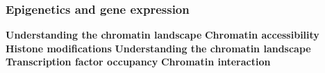 %
%
%
%
%
%
%
%
%
%
%
%
%
%
%

\subsubsection*{Epigenetics and gene expression}
\textbf{Understanding the chromatin landscape}
\textbf{Chromatin accessibility}
\textbf{Histone modifications}
\textbf{Understanding the chromatin landscape}
\textbf{Transcription factor occupancy}
\textbf{Chromatin interaction}


